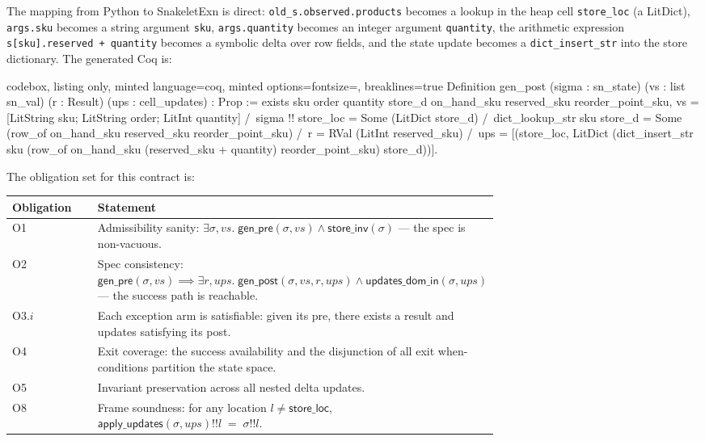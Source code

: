 \documentclass[11pt,a4paper]{article}
\begin{document}
\noindent The mapping from Python to SnakeletExn is direct:
\texttt{old\_s.observed.products} becomes a lookup in the heap cell
\texttt{store\_loc} (a LitDict), \texttt{args.sku} becomes a string
argument \texttt{sku}, \texttt{args.quantity} becomes an integer
argument \texttt{quantity}, the arithmetic expression
\texttt{s[sku].reserved + quantity} becomes a symbolic delta over
row fields, and the state update becomes a
\texttt{dict\_insert\_str} into the store dictionary.  The generated
Coq is:

\begin{tcblisting}{codebox, listing only,
  minted language=coq,
  minted options={fontsize=\small, breaklines=true}}
Definition gen_post (sigma : sn_state) (vs : list sn_val)
    (r : Result) (ups : cell_updates) : Prop :=
  exists sku order quantity store_d on_hand_sku
         reserved_sku reorder_point_sku,
    vs = [LitString sku; LitString order; LitInt quantity] /\
    sigma !! store_loc = Some (LitDict store_d) /\
    dict_lookup_str sku store_d =
      Some (row_of on_hand_sku reserved_sku reorder_point_sku) /\
    r = RVal (LitInt reserved_sku) /\
    ups = [(store_loc, LitDict (dict_insert_str sku
            (row_of on_hand_sku (reserved_sku + quantity)
                    reorder_point_sku) store_d))].
\end{tcblisting}

The obligation set for this contract is:

\begin{tabular}{@{}lp{0.7\linewidth}@{}}
\toprule
\textbf{Obligation} & \textbf{Statement} \\
\midrule
O1 & Admissibility sanity: $\exists \sigma, vs.\;
     \mathsf{gen\_pre}(\sigma, vs) \land \mathsf{store\_inv}(\sigma)$
     --- the spec is non-vacuous. \\
O2 & Spec consistency: $\mathsf{gen\_pre}(\sigma, vs) \implies
     \exists r, \mathit{ups}.\; \mathsf{gen\_post}(\sigma, vs, r, \mathit{ups})
     \land \mathsf{updates\_dom\_in}(\sigma, \mathit{ups})$
     --- the success path is reachable. \\
O3.$i$ & Each exception arm is satisfiable: given its pre, there
          exists a result and updates satisfying its post. \\
O4 & Exit coverage: the success availability and the disjunction of
     all exit when-conditions partition the state space. \\
O5 & Invariant preservation across all nested delta updates. \\
O8 & Frame soundness: for any location $l \neq \mathsf{store\_loc}$,
     $\mathsf{apply\_updates}(\sigma, \mathit{ups}) !! l \;=\; \sigma !! l$. \\
\bottomrule
\end{tabular}
\end{document}
